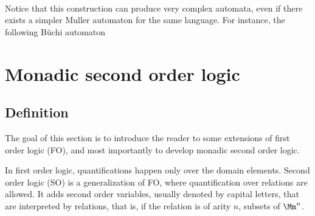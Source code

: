 \paragraph*{}
Notice that this construction can produce very complex
automata, even if there exists a simpler Muller automaton
for the same language. For instance,
the following Büchi automaton
\begin{center}
\end{center}



\section{Monadic second order logic}
\subsection{Definition}

The goal of this section is to introduce the reader
to some extensions of first order logic (FO),
and most importantly to develop monadic second order logic.

In first order logic, quantifications happen only over the
domain elements.
Second order logic (SO) is a generalization of FO,
where quantification over relations are allowed.
It adds second order variables, usually denoted by capital
letters, that are interpreted by relations, that is,
if the relation is of arity $n$, subsets of $\Mm^n$.

